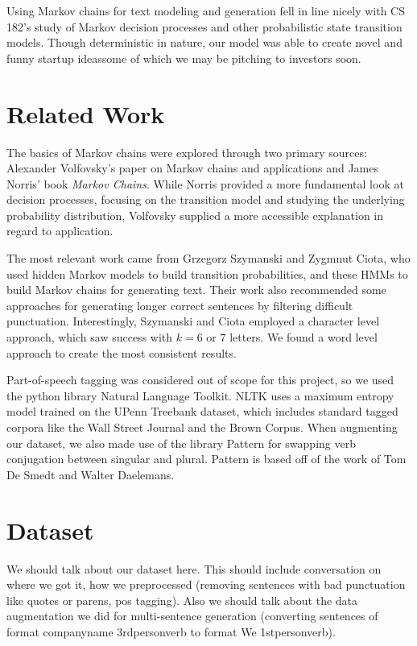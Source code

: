 \documentclass[11pt]{article}
\begin{document}
Using Markov chains for text modeling and generation fell in line nicely with CS 182's study of Markov decision processes and other probabilistic state transition models. Though deterministic in nature, our model was able to create novel and funny startup ideas\textemdash some of which we may be pitching to investors soon.

\section{Related Work}

The basics of Markov chains were explored through two primary sources: Alexander Volfovsky's paper on Markov chains and applications\cite{volfovsky2007} and James Norris' book \textit{Markov Chains}.\cite{norris1998} While Norris provided a more fundamental look at decision processes, focusing on the transition model and studying the underlying probability distribution, Volfovsky supplied a more accessible explanation in regard to application.

The most relevant work came from Grzegorz Szymanski and Zygmnut Ciota, who used hidden Markov models to build transition probabilities, and these HMMs to build Markov chains for generating text.\cite{szymanski2014} Their work also recommended some approaches for generating longer correct sentences by filtering difficult punctuation. Interestingly, Szymanski and Ciota employed a character level approach, which saw success with \(k = 6\) or \(7\) letters. We found a word level approach to create the most consistent results.

Part-of-speech tagging was considered out of scope for this project, so we used the python library Natural Language Toolkit.\cite{bird2015} NLTK uses a maximum entropy model trained on the UPenn Treebank dataset, which includes standard tagged corpora like the Wall Street Journal and the Brown Corpus.\cite{ratnaparkhi1996} When augmenting our dataset, we also made use of the library Pattern for swapping verb conjugation between singular and plural. Pattern is based off of the work of Tom De Smedt and Walter Daelemans.
\cite{desmedt2015}

\section{Dataset}

We should talk about our dataset here. This should include conversation on where we got it, how we preprocessed (removing sentences with bad punctuation like quotes or parens, pos tagging). Also we should talk about the data augmentation we did for multi-sentence generation (converting sentences of format companyname 3rdpersonverb to format We 1stpersonverb).
\end{document}
